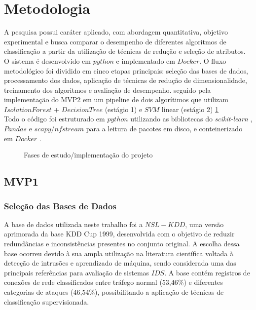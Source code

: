 \documentclass[a4paper,10pt, twocolumn]{article}
\begin{document}



\section{Metodologia}


A pesquisa possui caráter aplicado, com abordagem quantitativa, objetivo 
experimental e busca comparar o desempenho de diferentes algoritmos de 
classificação a partir da utilização de técnicas de redução e seleção de atributos. O sistema é desenvolvido em $python$ e implementado em $Docker$.
O fluxo metodológico foi dividido em cinco etapas principais: seleção das bases de 
dados, processamento dos dados, aplicação de técnicas de redução de dimensionalidade, 
treinamento dos algoritmos e avaliação de desempenho. seguido pela implementação do MVP2 em um pipeline de dois algorítimos que utilizam $Isolation Forest$ + $Decision Tree$ (estágio 1) e $SVM$ linear (estágio 2) \ref{fig:fases}\\
Todo o código foi estruturado em $python$ utilizando as bibliotecas do \textit{scikit-learn} \cite{scikit2026learn}, $Pandas$ e $scapy$/$nfstream$ para a leitura de pacotes em disco, e conteinerizado em $Docker$ \cite{Merkel2014Docker}.

\begin{figure}[H]
	\centering
	
	\caption{Fases de estudo/implementação do projeto}
	\label{fig:fases}
\end{figure}

\subsection{MVP1}
\subsubsection{Seleção das Bases de Dados}
A base de dados utilizada neste trabalho foi a $NSL-KDD$, uma versão aprimorada da 
base KDD Cup 1999, desenvolvida com o objetivo de reduzir redundâncias e 
inconsistências presentes no conjunto original. A escolha dessa base ocorreu devido 
à sua ampla utilização na literatura científica voltada à detecção de intrusões e 
aprendizado de máquina, sendo considerada uma das principais referências para 
avaliação de sistemas $IDS$. A base contém registros de 
conexões de rede classificados entre tráfego normal (53,46\%) e diferentes categorias 
de ataques (46,54\%), possibilitando a aplicação de técnicas de classificação 
supervisionada.
\end{document}
